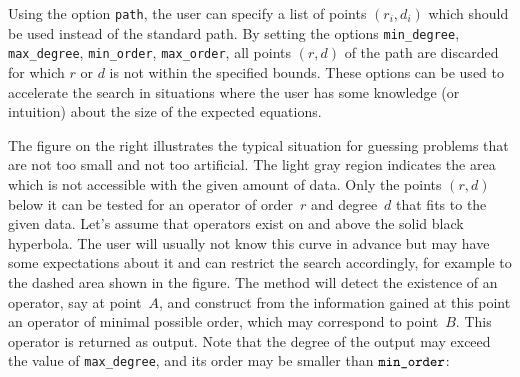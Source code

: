 \documentclass{amsart}
\begin{document}
Using the option \verb|path|, the user can specify a list of points $(r_i,d_i)$
which should be used instead of the standard path. By setting the options \verb|min_degree|,
\verb|max_degree|, \verb|min_order|, \verb|max_order|, all points $(r,d)$ of the path
are discarded for which $r$ or $d$ is not within the specified bounds. These options
can be used to accelerate the search in situations where the user has some knowledge
(or intuition) about the size of the expected equations. 

\hangindent=-6.3cm\leavevmode
{}%
The figure on the right illustrates the typical situation for guessing problems
that are not too small and not too artificial. The light gray region indicates
the area which is not accessible with the given amount of data. Only the points
$(r,d)$ below it can be tested for an operator of order~$r$ and degree~$d$ that
fits to the given data. Let's assume that operators exist on and above the solid
black hyperbola. The user will usually not know this curve in advance but may
have some expectations about it and can restrict the search accordingly, for
example to the dashed area shown in the figure. The method will detect the
existence of an operator, say at point~$A$, and construct from the information
gained at this point an operator of minimal possible order, which may correspond
to point~$B$.  This operator is returned as output. Note that the degree of the
output may exceed the value of \verb|max_degree|, and its order may be smaller
than $\verb|min_order|$:
\end{document}

